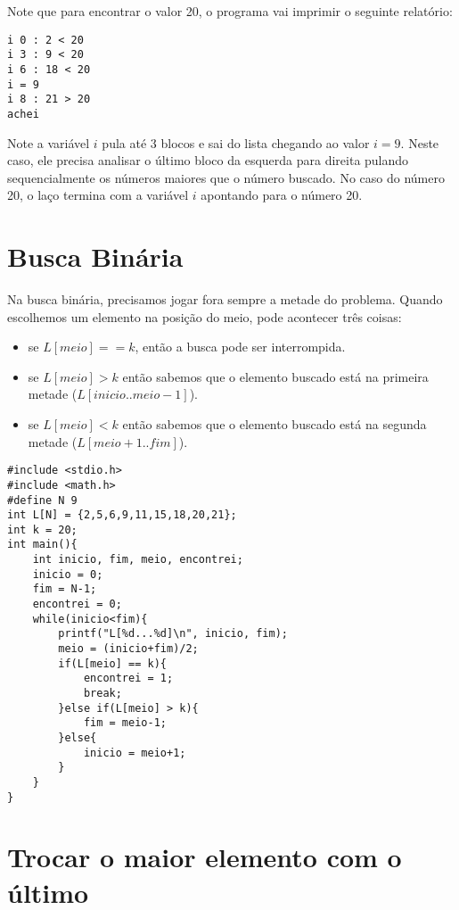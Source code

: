 \documentclass[a4paper,11pt]{article}
\begin{document}
Note que para encontrar o valor 20, o programa vai imprimir o seguinte relatório:
\begin{verbatim}
i 0 : 2 < 20
i 3 : 9 < 20
i 6 : 18 < 20
i = 9
i 8 : 21 > 20
achei
\end{verbatim}

Note a variável $i$ pula até 3 blocos e sai do lista chegando ao valor $i = 9$. Neste caso, ele precisa analisar o último bloco da esquerda para direita pulando sequencialmente os números maiores que o número buscado. No caso do número 20, o laço termina com a variável $i$ apontando para o número 20.

\newpage 

\section*{Busca Binária}

Na busca binária, precisamos jogar fora sempre a metade do problema. Quando escolhemos um elemento na posição do meio, pode acontecer três coisas:

\begin{itemize}
\item se $L[meio] == k$, então a busca pode ser interrompida.
\item se $L[meio] > k$ então sabemos que o elemento buscado está na primeira metade ($L[inicio..meio-1]$).
\item se $L[meio] < k$ então sabemos que o elemento buscado está na segunda metade ($L[meio+1..fim]$).

\end{itemize}

\begin{verbatim}
#include <stdio.h>
#include <math.h>
#define N 9
int L[N] = {2,5,6,9,11,15,18,20,21};
int k = 20;
int main(){
	int inicio, fim, meio, encontrei;
	inicio = 0;
	fim = N-1;
	encontrei = 0;
	while(inicio<fim){
		printf("L[%d...%d]\n", inicio, fim);
		meio = (inicio+fim)/2;
		if(L[meio] == k){
			encontrei = 1;
			break;
		}else if(L[meio] > k){
			fim = meio-1;
		}else{
			inicio = meio+1;
		}
	}	
}
\end{verbatim}

\newpage 

\section*{Trocar o maior elemento com o último}
\end{document}
